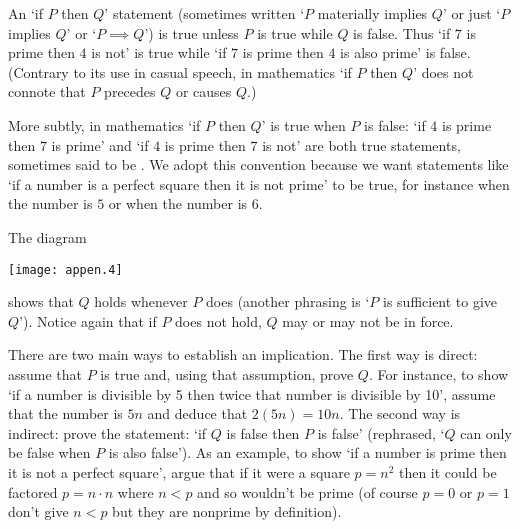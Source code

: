 An `if \( P \) then \( Q \)' statement (sometimes written
`$P$ materially implies $Q$' or just
`\( P \) implies \( Q \)' or `\( P\implies Q\)') is true unless \( P \)
is true while \( Q \) is false.
Thus `if \( 7 \) is prime then \( 4 \) is not' is true 
while `if \( 7 \) is prime then \( 4 \) is also prime' is false.
(Contrary to its
use in casual speech, in mathematics `if \( P \) then \( Q \)' 
does not connote that
\( P \) precedes \( Q \) or causes \( Q \).)

More subtly, in mathematics `if \( P \) then \( Q \)' is
true when \( P \) is false:
`if \( 4 \) is prime then \( 7 \) is prime' and
`if \( 4 \) is prime then \( 7 \) is not' are both true statements,
sometimes said to be .
We adopt this convention because we want statements like `if
a number is a perfect square then it is not prime' to be true, for
instance when the number is \( 5 \) or when the number is \( 6 \).

The diagram
\begin{center}
  \texttt{[image: appen.4]}
\end{center}
shows that \( Q \) holds whenever \( P \) does (another phrasing is
`\( P \) is sufficient to give \( Q \)').
Notice again that if \( P \) does not hold, \( Q \) may or may not
be in force.

There are two main ways to establish an implication.
The first way is direct: assume that \( P \) is true and, using that
assumption, prove \( Q \).
For instance,
to show `if a number is divisible by 5 then twice that
number is divisible by 10', assume that the number is \( 5n \) and
deduce that \( 2(5n)=10n \).
The second way is indirect: prove the 
statement: `if \( Q \) is false then \( P \) is false'
(rephrased, `\( Q \) can only be false when \( P \) is also false').
As an example, to show `if a number is prime then it
is not a perfect
square', argue that if it were a square \( p=n^2 \) then it could be
factored \( p=n\cdot n \) where \( n<p \) and so wouldn't be prime
(of course \( p=0 \) or \( p=1 \) don't give \( n<p \) but they
are nonprime by definition).

